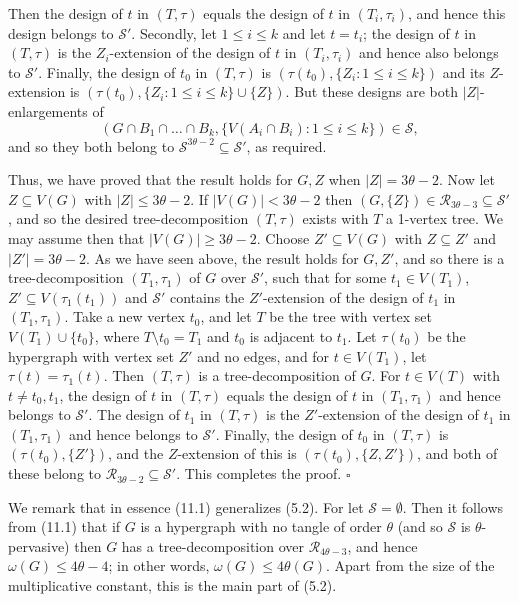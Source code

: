 Then the design of $t$ in $(T, \tau)$ equals the design of $t$ in $(T_i, \tau_i)$, and hence this design belongs to $\mathscr{S}'$. Secondly, let $1 \le i \le k$ and let $t = t_i$; the design of $t$ in $(T, \tau)$ is the $Z_i$-extension of the design of $t$ in $(T_i, \tau_i)$ and hence also belongs to $\mathscr{S}'$. Finally, the design of $t_0$ in $(T, \tau)$ is $(\tau(t_0), \{Z_i: 1 \le i \le k\})$ and its $Z$-extension is $(\tau(t_0), \{Z_i: 1 \le i \le k\} \cup \{Z\})$. But these designs are both $|Z|$-enlargements of
\begin{equation*}
(G \cap B_1 \cap \dots \cap B_k, \{V(A_i \cap B_i): 1 \le i \le k\}) \in \mathscr{S},
\end{equation*}
and so they both belong to $\mathscr{S}^{3\theta - 2} \subseteq \mathscr{S}'$, as required.

Thus, we have proved that the result holds for $G, Z$ when $|Z| = 3\theta - 2$. Now let $Z \subseteq V(G)$ with $|Z| \le 3\theta - 2$. If $|V(G)| < 3\theta - 2$ then $(G, \{Z\}) \in \mathscr{R}_{3\theta - 3} \subseteq \mathscr{S}'$, and so the desired tree-decomposition $(T, \tau)$ exists with $T$ a 1-vertex tree. We may assume then that $|V(G)| \ge 3\theta - 2$. Choose $Z' \subseteq V(G)$ with $Z \subseteq Z'$ and $|Z'| = 3\theta - 2$. As we have seen above, the result holds for $G, Z'$, and so there is a tree-decomposition $(T_1, \tau_1)$ of $G$ over $\mathscr{S}'$, such that for some $t_1 \in V(T_1)$, $Z' \subseteq V(\tau_1(t_1))$ and $\mathscr{S}'$ contains the $Z'$-extension of the design of $t_1$ in $(T_1, \tau_1)$. Take a new vertex $t_0$, and let $T$ be the tree with vertex set $V(T_1) \cup \{t_0\}$, where $T \setminus t_0 = T_1$ and $t_0$ is adjacent to $t_1$. Let $\tau(t_0)$ be the hypergraph with vertex set $Z'$ and no edges, and for $t \in V(T_1)$, let $\tau(t) = \tau_1(t)$. Then $(T, \tau)$ is a tree-decomposition of $G$. For $t \in V(T)$ with $t \ne t_0, t_1$, the design of $t$ in $(T, \tau)$ equals the design of $t$ in $(T_1, \tau_1)$ and hence belongs to $\mathscr{S}'$. The design of $t_1$ in $(T, \tau)$ is the $Z'$-extension of the design of $t_1$ in $(T_1, \tau_1)$ and hence belongs to $\mathscr{S}'$. Finally, the design of $t_0$ in $(T, \tau)$ is $(\tau(t_0), \{Z'\})$, and the $Z$-extension of this is $(\tau(t_0), \{Z, Z'\})$, and both of these belong to $\mathscr{R}_{3\theta - 2} \subseteq \mathscr{S}'$. This completes the proof. $\square$

We remark that in essence (11.1) generalizes (5.2). For let $\mathscr{S} = \emptyset$. Then it follows from (11.1) that if $G$ is a hypergraph with no tangle of order $\theta$ (and so $\mathscr{S}$ is $\theta$-pervasive) then $G$ has a tree-decomposition over $\mathscr{R}_{4\theta - 3}$, and hence $\omega(G) \le 4\theta - 4$; in other words, $\omega(G) \le 4\theta(G)$. Apart from the size of the multiplicative constant, this is the main part of (5.2).


